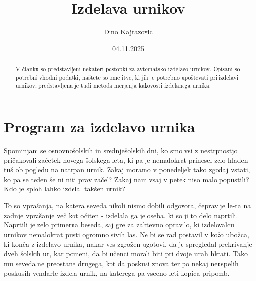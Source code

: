 \documentclass[10pt,a4paper]{article}
\begin{document}

 
   
\title{Izdelava urnikov}
\author{Dino Kajtazovic}
\date{04.11.2025}
\maketitle


\begin{abstract}
   
V članku so predstavljeni nekateri postopki za avtomatsko izdelavo urnikov. Opisani so
potrebni vhodni podatki, naštete so omejitve, ki jih je potrebno upoštevati pri izdelavi
urnikov, predstavljena je tudi metoda merjenja kakovosti izdelanega urnika.
\end{abstract}

\section{Program za izdelavo urnika} %

Spominjam se osnovnošolskih in srednješolskih dni, ko smo vsi z nestrpnostjo pričakovali
začetek novega šolskega leta, ki pa je nemalokrat prinesel zelo hladen tuš ob pogledu na
natrpan urnik. Zakaj moramo v ponedeljek tako zgodaj vstati, ko pa se teden še ni niti
prav začel? Zakaj nam vsaj v petek niso malo popustili? Kdo je sploh lahko izdelal
takšen urnik?

To so vprašanja, na katera seveda nikoli nismo dobili odgovora, čeprav je le-ta na zadnje
vprašanje več kot očiten - izdelala ga je oseba, ki so ji to delo naprtili. Naprtili je
zelo primerna beseda, saj gre za zahtevno opravilo, ki izdelovalcu urnikov nemalokrat
pusti ogromno sivih las. Ne bi se rad postavil v kožo ubožca, ki konča z izdelavo urnika,
nakar ves zgrožen ugotovi, da je spregledal prekrivanje dveh šolskih ur, kar pomeni, da
bi učenci morali biti pri dvoje urah hkrati. Tako mu seveda ne preostane drugega, kot da
poskusi znova ter po nekaj neuspelih poskusih vendarle izdela urnik, na katerega pa vseeno
leti kopica pripomb.
\end{document}
